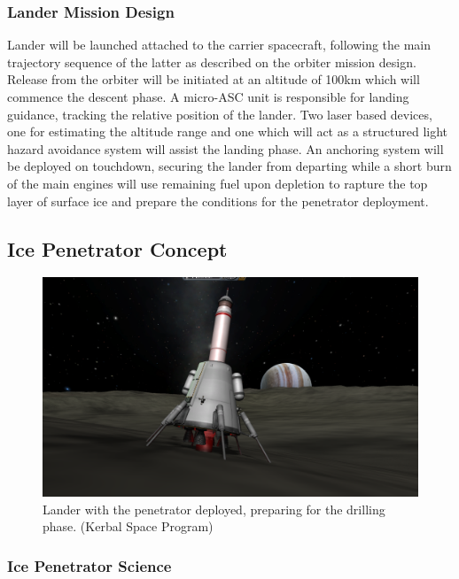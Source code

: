 \subsubsection{Lander Mission Design}

Lander will be launched attached to the carrier spacecraft, following the main trajectory sequence of the latter as described on the orbiter mission design.  
Release from the orbiter will be initiated at an altitude of 100km which will commence the descent phase. A micro-ASC unit is responsible for landing guidance, tracking the relative position of the lander. Two laser based devices, one for estimating the altitude range and one which will act as a structured light hazard avoidance system will assist the landing phase. An anchoring system will be deployed on touchdown, securing the lander from departing while a short burn of the main engines will use remaining fuel upon depletion to rapture the top layer of surface ice and prepare the conditions for the penetrator deployment. 

\subsection{Ice Penetrator Concept}

\begin{figure}[htb!]
\centering
\includegraphics[width=\textwidth]{figures/Orbiter/8.PNG}
\caption{Lander with the penetrator deployed, preparing for the drilling phase. (Kerbal Space Program)}
\label{fig:penetrator}
\end{figure}

\subsubsection{Ice Penetrator Science}

